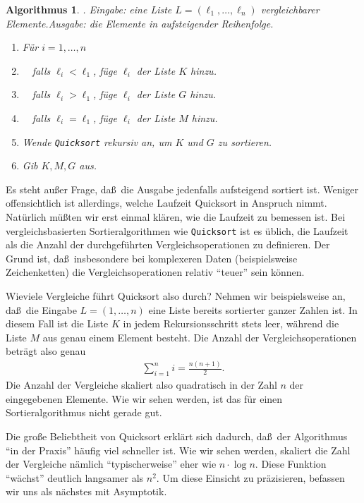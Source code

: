 \documentclass[10pt,reqno]{amsart}
\numberwithin{equation}{section}
\newtheorem{algorithm}[definition]{Algorithmus}
\begin{document}
\begin{algorithm}. {\em Eingabe:} eine Liste $L=(\ell_1,\ldots,\ell_n)$ vergleichbarer Elemente.\label{alg_qs}
	{\em Ausgabe:} die Elemente in aufsteigender Reihenfolge.
	\begin{enumerate}
		\item F\"ur $i=1,\ldots,n$
		\item $\quad$falls $\ell_i<\ell_1$, f\"uge $\ell_i$ der Liste $K$ hinzu.
		\item $\quad$falls $\ell_i>\ell_1$, f\"uge $\ell_i$ der Liste $G$ hinzu.
		\item $\quad$falls $\ell_i=\ell_1$, f\"uge $\ell_i$ der Liste $M$ hinzu.
		\item Wende {\tt Quicksort} rekursiv an, um $K$ und $G$ zu sortieren.
		\item Gib $K,M,G$ aus.
	\end{enumerate}
\end{algorithm}

Es steht au\ss er Frage, da\ss\ die Ausgabe jedenfalls aufsteigend sortiert ist.
Weniger offensichtlich ist allerdings, welche Laufzeit Quicksort in Anspruch nimmt.
Nat\"urlich m\"u\ss ten wir erst einmal kl\"aren, wie die Laufzeit zu bemessen ist.
Bei vergleichsbasierten Sortieralgorithmen wie {\tt Quicksort} ist es \"ublich, die Laufzeit als die Anzahl der durchgef\"uhrten Vergleichsoperationen zu definieren.
Der Grund ist, da\ss\ insbesondere bei komplexeren Daten (beispielsweise Zeichenketten) die Vergleichsoperationen relativ ``teuer'' sein k\"onnen.

Wieviele Vergleiche f\"uhrt Quicksort also durch?
Nehmen wir beispielsweise an, da\ss\ die Eingabe $L=(1,\ldots,n)$ eine Liste bereits sortierter ganzer Zahlen ist.
In diesem Fall ist die Liste $K$ in jedem Rekursionsschritt stets leer, w\"ahrend die Liste $M$ aus genau einem Element besteht.
Die Anzahl der Vergleichsoperationen betr\"agt also genau
\begin{align}\label{eqsum}
	\sum_{i=1}^n i=\frac{n(n+1)}2.
\end{align}
Die Anzahl der Vergleiche skaliert also quadratisch in der Zahl $n$ der eingegebenen Elemente.
Wie wir sehen werden, ist das f\"ur einen Sortieralgorithmus nicht gerade gut.

Die gro\ss e Beliebtheit von Quicksort erkl\"art sich dadurch, da\ss\ der Algorithmus ``in der Praxis'' h\"aufig viel schneller ist.
Wie wir sehen werden, skaliert die Zahl der Vergleiche n\"amlich ``typischerweise'' eher wie $n\cdot\log n$.
Diese Funktion ``w\"achst'' deutlich langsamer als $n^2$.
Um diese Einsicht zu pr\"azisieren, befassen wir uns als n\"achstes mit Asymptotik.
\end{document}

